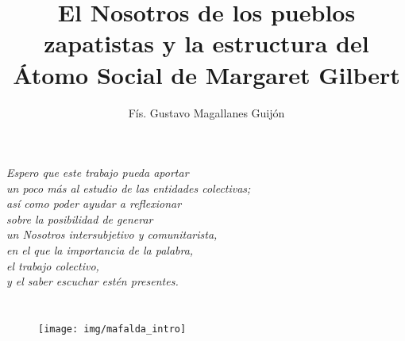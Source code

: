 \documentclass[oneside]{book}
\begin{document}
\title{El Nosotros de los pueblos zapatistas y la estructura del Átomo Social de Margaret Gilbert} %

\author{Fís. Gustavo Magallanes Guijón}
\date{}
\thispagestyle{empty}
\maketitle
\thispagestyle{empty}
\maketitle

\thispagestyle{empty}
\setlength{\headheight}{15pt}
\frontmatter

\chapter*{}
\begin{flushright}
    
    \textit{Espero que este trabajo pueda aportar\\ un poco más al estudio de las entidades colectivas; \\así como poder ayudar a reflexionar\\ sobre la posibilidad de generar\\ un Nosotros intersubjetivo y comunitarista,\\ en el que la importancia de la palabra,\\ el trabajo colectivo,\\ y el saber escuchar estén presentes.}
\end{flushright}

\chapter*{}
\begin{flushright}
 
\begin{figure}[h]
\begin{flushright}
	\texttt{[image: img/mafalda\_intro]}
\end{flushright}

\end{figure}


\end{flushright}
\end{document}
